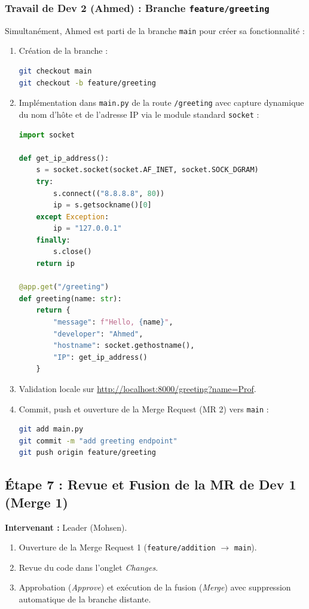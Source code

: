 \documentclass[a4paper,12pt]{article}
\begin{document}
\subsubsection{Travail de Dev 2 (Ahmed) : Branche \texttt{feature/greeting}}
Simultanément, Ahmed est parti de la branche \texttt{main} pour créer sa fonctionnalité :
\begin{enumerate}
    \item Création de la branche :
\begin{lstlisting}[language=bash]
git checkout main
git checkout -b feature/greeting
\end{lstlisting}
    \item Implémentation dans \texttt{main.py} de la route \texttt{/greeting} avec capture dynamique du nom d'hôte et de l'adresse IP via le module standard \texttt{socket} :
\begin{lstlisting}[language=Python]
import socket

def get_ip_address():
    s = socket.socket(socket.AF_INET, socket.SOCK_DGRAM)
    try:
        s.connect(("8.8.8.8", 80))
        ip = s.getsockname()[0]
    except Exception:
        ip = "127.0.0.1"
    finally:
        s.close()
    return ip

@app.get("/greeting")
def greeting(name: str):
    return {
        "message": f"Hello, {name}",
        "developer": "Ahmed",
        "hostname": socket.gethostname(),
        "IP": get_ip_address()
    }
\end{lstlisting}
    \item Validation locale sur \url{http://localhost:8000/greeting?name=Prof}.
    \item Commit, push et ouverture de la Merge Request (MR 2) vers \texttt{main} :
\begin{lstlisting}[language=bash]
git add main.py
git commit -m "add greeting endpoint"
git push origin feature/greeting
\end{lstlisting}
\end{enumerate}

\subsection{Étape 7 : Revue et Fusion de la MR de Dev 1 (Merge 1)}
\textbf{Intervenant :} Leader (Mohsen).

\begin{enumerate}
    \item Ouverture de la Merge Request 1 (\texttt{feature/addition} $\rightarrow$ \texttt{main}).
    \item Revue du code dans l'onglet \textit{Changes}.
    \item Approbation (\textit{Approve}) et exécution de la fusion (\textit{Merge}) avec suppression automatique de la branche distante.
\end{enumerate}
\end{document}
